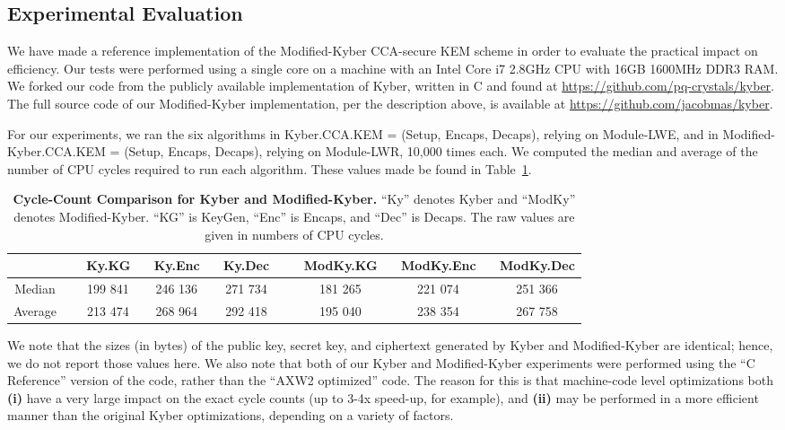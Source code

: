 \subsection{Experimental Evaluation}
\label{sec:modif-kyber-expt}

We have made a reference implementation of the Modified-Kyber CCA-secure KEM scheme in order to evaluate the practical impact on efficiency. Our tests were performed using a single core on a machine with an Intel Core i7 2.8GHz CPU with 16GB 1600MHz DDR3 RAM. We forked our code from the publicly available implementation of Kyber, written in C and found at \url{https://github.com/pq-crystals/kyber}. The full source code of our Modified-Kyber implementation, per the description above, is available at \url{https://github.com/jacobmas/kyber}.

For our experiments, we ran the six algorithms in Kyber.CCA.KEM = (Setup, Encaps, Decaps), relying on Module-LWE, and in Modified-Kyber.CCA.KEM = (Setup, Encaps, Decaps), relying on Module-LWR, 10,000 times each. We computed the median and average of the number of CPU cycles required to run each algorithm. These values made be found in Table~\ref{tab:kyber}.

\begin{table}[!hb]
\begin{center}
\begin{tabular}{ c | c  c  c | c  c  c }
\hline
 & \,\,\, Ky.KG & \,\,\, Ky.Enc & \,\,\, Ky.Dec \,\,\, & \,\,\, ModKy.KG & \,\,\, ModKy.Enc & \,\,\, ModKy.Dec \\
\hline
Median\,\,\, & \,\,\,\,\,199 841 & \,\,\, 246 136 & \,\,\, 271 734 \,\,\, & \,\,\, 181 265 & \,\,\, 221 074 & \,\,\, 251 366 \\
Average\,\,\, & \,\,\, 213 474 & \,\,\, 268 964 & \,\,\, 292 418 \,\,\, & \,\,\, 195 040 & \,\,\, 238 354 & \,\,\, 267 758 \\
\hline
\end{tabular}
\end{center}
\caption{{\bf Cycle-Count Comparison for Kyber and Modified-Kyber.} ``Ky'' denotes Kyber and ``ModKy'' denotes Modified-Kyber. ``KG'' is KeyGen, ``Enc'' is Encaps, and ``Dec'' is Decaps. The raw values are given in numbers of CPU cycles.}\label{tab:kyber}
\end{table}

We note that the sizes (in bytes) of the public key, secret key, and ciphertext generated by Kyber and Modified-Kyber are identical; hence, we do not report those values here. We also note that both of our Kyber and Modified-Kyber experiments were performed using the ``C Reference'' version of the code, rather than the ``AXW2 optimized'' code. The reason for this is that machine-code level optimizations both {\bf (i)} have a very large impact on the exact cycle counts (up to 3-4x speed-up, for example), and {\bf (ii)} may be performed in a more efficient manner than the original Kyber optimizations, depending on a variety of factors.

